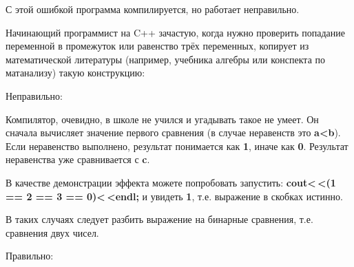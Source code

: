 \begin{typerror}
	\label{TE_transitive-comparison}

	С этой ошибкой программа компилируется, но работает неправильно.

	Начинающий программист на C++ зачастую,
	когда нужно проверить попадание переменной в промежуток
	или равенство трёх переменных,
	копирует из математической литературы (например, учебника алгебры или конспекта по матанализу)
	такую конструкцию:

	Неправильно:

	Компилятор, очевидно, в школе не учился и угадывать такое не умеет.
	Он сначала вычисляет значение первого сравнения
	(в случае неравенств это \textbf{a<b}).
	Если неравенство выполнено, результат понимается как \textbf{1}, иначе как \textbf{0}.
	Результат неравенства уже сравнивается с \textbf{c}.

	В качестве демонстрации эффекта можете попробовать запустить:
	\textbf{cout<\,\!<(1 == 2 == 3 == 0)<\,\!<endl;} и увидеть \textbf{1},
	т.е. выражение в скобках истинно.

	В таких случаях следует разбить выражение на бинарные сравнения, т.е. сравнения двух чисел.

	Правильно:

\end{typerror}
